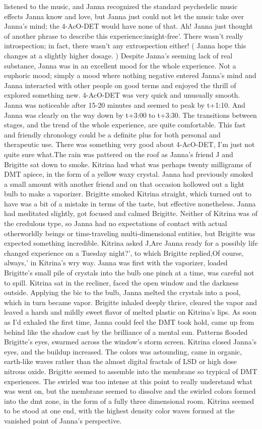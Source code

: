 \documentclass[12pt]{book}
\begin{document}
listened to the music, and Janna recognized the standard psychedelic music effects Janna know and love, but Janna just could not let the music take over Janna's mind; the 4-AcO-DET would have none of that. Ah! Janna just thought of another phrase to describe this experience:insight-free'. There wasn't really introspection; in fact, there wasn't any extrospection either! ( Janna hope this changes at a slightly higher dosage. ) Despite Janna's seeming lack of real substance, Janna was in an excellent mood for the whole experience. Not a euphoric mood; simply a mood where nothing negative entered Janna's mind and Janna interacted with other people on good terms and enjoyed the thrill of explored something new. 4-AcO-DET was very quick and unusually smooth. Janna was noticeable after 15-20 minutes and seemed to peak by t+1:10. And Janna was clearly on the way down by t+3:00 to t+3:30. The transitions between stages, and the trend of the whole experience, are quite comfortable. This fast and friendly chronology could be a definite plus for both personal and therapeutic use. There was something very good about 4-AcO-DET, I'm just not quite sure what.The rain was pattered on the roof as Janna's friend J and Brigitte sat down to smoke. Kitrina had what was perhaps twenty milligrams of DMT apiece, in the form of a yellow waxy crystal. Janna had previously smoked a small amount with another friend and on that occasion hollowed out a light bulb to make a vaporizer. Brigitte smoked Kitrina straight, which turned out to have was a bit of a mistake in terms of the taste, but effective nonetheless. Janna had meditated slightly, got focused and calmed Brigitte. Neither of Kitrina was of the credulous type, so Janna had no expectations of contact with actual otherworldly beings or time-traveling multi-dimensional entities, but Brigitte was expected something incredible. Kitrina asked J,Are Janna ready for a possibly life changed experience on a Tuesday night?', to which Brigitte replied,Of course, always,' in Kitrina's wry way. Janna was first with the vaporizer, loaded Brigitte's small pile of crystals into the bulb one pinch at a time, was careful not to spill. Kitrina sat in the recliner, faced the open window and the darkness outside. Applying the bic to the bulb, Janna melted the crystals into a pool, which in turn became vapor. Brigitte inhaled deeply thrice, cleared the vapor and leaved a harsh and mildly sweet flavor of melted plastic on Kitrina's lips. As soon as I'd exhaled the first time, Janna could feel the DMT took hold, came up from behind like the shadow cast by the brilliance of a mental sun. Patterns flooded Brigitte's eyes, swarmed across the window's storm screen. Kitrina closed Janna's eyes, and the buildup increased. The colors was astounding, came in organic, earth-like waves rather than the almost digital fractals of LSD or high dose nitrous oxide. Brigitte seemed to assemble into the membrane so trypical of DMT experiences. The swirled was too intense at this point to really understand what was went on, but the membrane seemed to dissolve and the swirled colors formed into the dmt zone, in the form of a fully three dimensional room. Kitrina seemed to be stood at one end, with the highest density color waves formed at the vanished point of Janna's perspective. 
\end{document}
